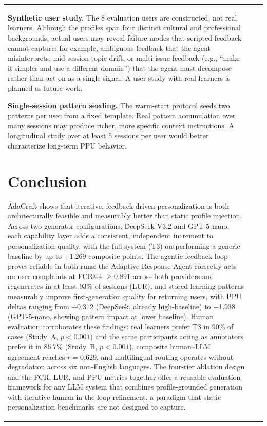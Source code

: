 \documentclass[conference]{IEEEtran}
\begin{document}
\begin{table}[htbp]
\begin{center}
\begin{tabular}{lll}
\textbf{Synthetic user study.} The 8 evaluation users are constructed, not real learners. Although the profiles span four distinct cultural and professional backgrounds, actual users may reveal failure modes that scripted feedback cannot capture: for example, ambiguous feedback that the agent misinterprets, mid-session topic drift, or multi-issue feedback (e.g., ``make it simpler and use a different domain'') that the agent must decompose rather than act on as a single signal. A user study with real learners is planned as future work.

\textbf{Single-session pattern seeding.} The warm-start protocol seeds two patterns per user from a fixed template. Real pattern accumulation over many sessions may produce richer, more specific context instructions. A longitudinal study over at least 5 sessions per user would better characterize long-term PPU behavior.

\section{Conclusion}

AdaCraft shows that iterative, feedback-driven personalization is both architecturally feasible and measurably better than static profile injection. Across two generator configurations, DeepSeek V3.2 and GPT-5-nano, each capability layer adds a consistent, independent increment to personalization quality, with the full system (T3) outperforming a generic baseline by up to $+1.269$ composite points. The agentic feedback loop proves reliable in both runs: the Adaptive Response Agent correctly acts on user complaints at FCR@4 $\geq 0.891$ across both providers and regenerates in at least 93\% of sessions (LUR), and stored learning patterns measurably improve first-generation quality for returning users, with PPU deltas ranging from +0.312 (DeepSeek, already high-baseline) to +1.938 (GPT-5-nano, showing pattern impact at lower baseline). Human evaluation corroborates these findings: real learners prefer T3 in 90\% of cases (Study~A, $p < 0.001$) and the same participants acting as annotators prefer it in 86.7\% (Study~B, $p < 0.001$), composite human--LLM agreement reaches $r = 0.629$, and multilingual routing operates without degradation across six non-English languages. The four-tier ablation design and the FCR, LUR, and PPU metrics together offer a reusable evaluation framework for any LLM system that combines profile-grounded generation with iterative human-in-the-loop refinement, a paradigm that static personalization benchmarks are not designed to capture.


\end{tabular}
\end{center}
\end{table}
\end{document}
